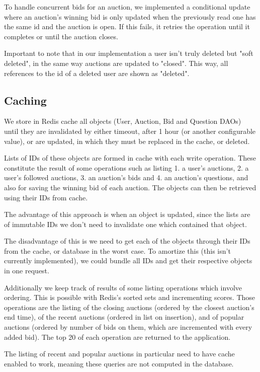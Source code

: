 \documentclass[runningheads]{llncs}
\begin{document}
To handle concurrent bids for an auction, we implemented a conditional update where an auction's winning bid is only updated when the previously read one has the same id and the auction is open. If this fails, it retries the operation until it completes or until the auction closes.

Important to note that in our implementation a user isn't truly deleted but "soft deleted", in the same way auctions are updated to "closed". This way, all references to the id of a deleted user are shown as "deleted".

\subsection{Caching}

We store in Redis cache all objects (User, Auction, Bid and Question DAOs) until they are invalidated by either timeout, after 1 hour (or another configurable value), or are updated, in which they must be replaced in the cache, or deleted. 

Lists of IDs of these objects are formed in cache with each write operation. These constitute the result of some operations such as listing 1. a user's auctions, 2. a user's followed auctions, 3. an auction's bids and 4. an auction's questions, and also for saving the winning bid of each auction. The objects can then be retrieved using their IDs from cache. 

The advantage of this approach is when an object is updated, since the lists are of immutable IDs we don't need to invalidate one which contained that object. 

The disadvantage of this is we need to get each of the objects through their IDs from the cache, or database in the worst case. To amortize this (this isn't currently implemented), we could bundle all IDs and get their respective objects in one request.

Additionally we keep track of results of some listing operations which involve ordering. This is possible with Redis's sorted sets and incrementing scores. Those operations are the listing of the closing auctions (ordered by the closest auction's end time), of the recent auctions (ordered in list on insertion), and of popular auctions (ordered by number of bids on them, which are incremented with every added bid). The top 20 of each operation are returned to the application.

The listing of recent and popular auctions in particular need to have cache enabled to work, meaning these queries are not computed in the database.
\end{document}
